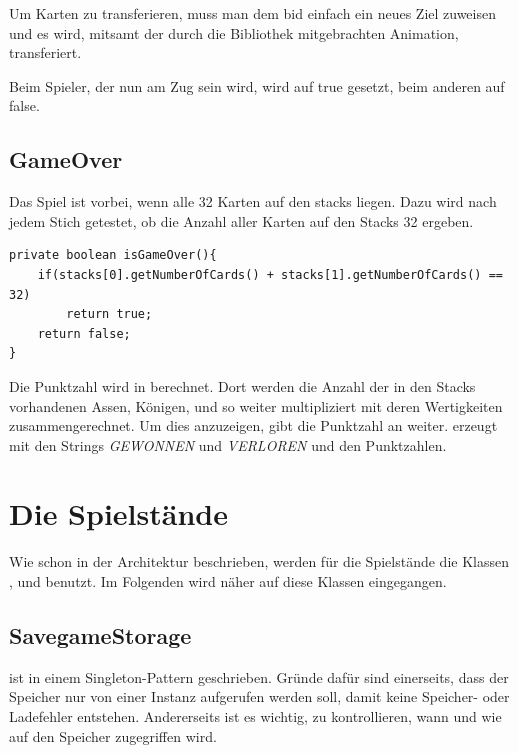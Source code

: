 Um Karten zu transferieren, muss man dem bid einfach ein neues Ziel zuweisen und
es wird, mitsamt der durch die Bibliothek mitgebrachten Animation, transferiert.

Beim Spieler, der nun am Zug sein wird, wird  auf true
gesetzt, beim anderen auf false.

\subsection{GameOver}

Das Spiel ist vorbei, wenn alle 32 Karten auf den stacks liegen. Dazu wird nach
jedem Stich getestet, ob die Anzahl aller Karten auf den Stacks 32 ergeben.

\begin{lstlisting}[caption={isGameOver() Methode},captionpos=b]
private boolean isGameOver(){
    if(stacks[0].getNumberOfCards() + stacks[1].getNumberOfCards() == 32)
        return true;
    return false;
}
\end{lstlisting}

Die Punktzahl wird in  berechnet. Dort werden die Anzahl
der in den Stacks vorhandenen Assen, Königen, und so weiter multipliziert mit
deren Wertigkeiten zusammengerechnet. Um dies anzuzeigen, gibt 
die Punktzahl an  weiter.  erzeugt
 mit den Strings \emph{GEWONNEN} und \emph{VERLOREN} und den
Punktzahlen.

\section{Die Spielstände}
\sectionauthor{\leonard}

Wie schon in der Architektur beschrieben, werden für die Spielstände die Klassen
,  und  benutzt. Im
Folgenden wird näher auf diese Klassen eingegangen.

\subsection{SavegameStorage}

ist in einem Singleton-Pattern geschrieben. Gründe dafür sind einerseits, dass
der Speicher nur von einer Instanz aufgerufen werden soll, damit keine Speicher-
oder Ladefehler entstehen. Andererseits ist es wichtig, zu kontrollieren, wann
und wie auf den Speicher zugegriffen wird.

